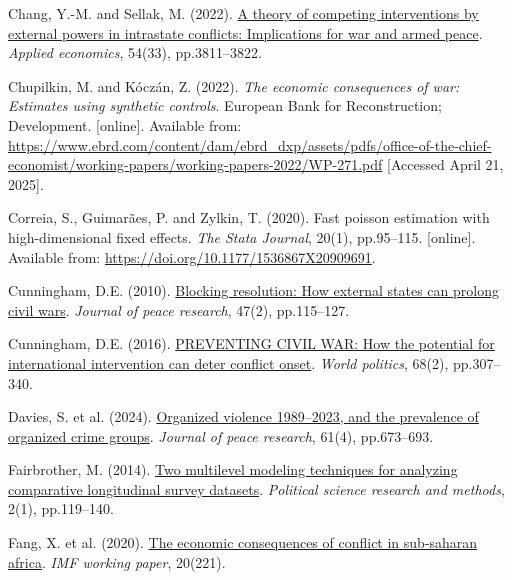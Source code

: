 \documentclass[
]{article}
\newlength{\cslhangindent}
\newenvironment{CSLReferences}[2] %
 {\begin{list}{}{%
  \setlength{\itemindent}{0pt}
  \setlength{\leftmargin}{0pt}
  \setlength{\parsep}{0pt}
  \ifodd #1
   \setlength{\leftmargin}{\cslhangindent}
   \setlength{\itemindent}{-1\cslhangindent}
  \fi
  \setlength{\itemsep}{#2\baselineskip}}}
 {\end{list}}
\begin{document}
\begin{CSLReferences}{0}{1}
Chang, Y.-M. and Sellak, M. (2022).
\href{https://doi.org/10.1080/00036846.2021.2016588}{A theory of
competing interventions by external powers in intrastate conflicts:
Implications for war and armed peace}. \emph{Applied economics}, 54(33),
pp.3811--3822.

Chupilkin, M. and Kóczán, Z. (2022). \emph{The economic consequences of
war: Estimates using synthetic controls}. European Bank for
Reconstruction; Development. {[}online{]}. Available from:
\url{https://www.ebrd.com/content/dam/ebrd_dxp/assets/pdfs/office-of-the-chief-economist/working-papers/working-papers-2022/WP-271.pdf}
{[}Accessed April 21, 2025{]}.

Correia, S., Guimarães, P. and Zylkin, T. (2020). Fast poisson
estimation with high-dimensional fixed effects. \emph{The Stata
Journal}, 20(1), pp.95--115. {[}online{]}. Available from:
\url{https://doi.org/10.1177/1536867X20909691}.

Cunningham, D.E. (2010).
\href{https://doi.org/10.1177/0022343309353488}{Blocking resolution: How
external states can prolong civil wars}. \emph{Journal of peace
research}, 47(2), pp.115--127.

Cunningham, D.E. (2016).
\href{https://doi.org/10.1017/S0043887115000404}{PREVENTING CIVIL WAR:
How the potential for international intervention can deter conflict
onset}. \emph{World politics}, 68(2), pp.307--340.

Davies, S. et al. (2024).
\href{https://doi.org/10.1177/00223433241262912}{Organized violence
1989--2023, and the prevalence of organized crime groups}. \emph{Journal
of peace research}, 61(4), pp.673--693.

Fairbrother, M. (2014). \href{https://doi.org/10.1017/psrm.2013.24}{Two
multilevel modeling techniques for analyzing comparative longitudinal
survey datasets}. \emph{Political science research and methods}, 2(1),
pp.119--140.

Fang, X. et al. (2020).
\href{https://doi.org/10.5089/9781513559667.001}{The economic
consequences of conflict in sub-saharan africa}. \emph{IMF working
paper}, 20(221).


\end{CSLReferences}
\end{document}
